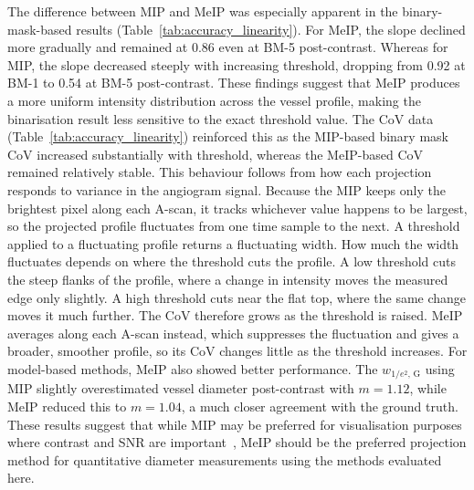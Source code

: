 \documentclass{optica-article}
\begin{document}
The difference between MIP and MeIP was especially apparent in the binary-mask-based results (Table~\ref{tab:accuracy_linearity}). For MeIP, the slope declined more gradually and remained at 0.86 even at BM-5 post-contrast. Whereas for MIP, the slope decreased steeply with increasing threshold, dropping from 0.92 at BM-1 to 0.54 at BM-5 post-contrast. These findings suggest that MeIP produces a more uniform intensity distribution across the vessel profile, making the binarisation result less sensitive to the exact threshold value. The CoV data (Table~\ref{tab:accuracy_linearity}) reinforced this as the MIP-based binary mask CoV increased substantially with threshold, whereas the MeIP-based CoV remained relatively stable. This behaviour follows from how each projection responds to variance in the angiogram signal. Because the MIP keeps only the brightest pixel along each A-scan, it tracks whichever value happens to be largest, so the projected profile fluctuates from one time sample to the next. A threshold applied to a fluctuating profile returns a fluctuating width. How much the width fluctuates depends on where the threshold cuts the profile. A low threshold cuts the steep flanks of the profile, where a change in intensity moves the measured edge only slightly. A high threshold cuts near the flat top, where the same change moves it much further. The CoV therefore grows as the threshold is raised. MeIP averages along each A-scan instead, which suppresses the fluctuation and gives a broader, smoother profile, so its CoV changes little as the threshold increases. For model-based methods, MeIP also showed better performance. The $w_{1/e^2,\,\mathrm{G}}$ using MIP slightly overestimated vessel diameter post-contrast with $m = 1.12$, while MeIP reduced this to $m = 1.04$, a much closer agreement with the ground truth. These results suggest that while MIP may be preferred for visualisation purposes where contrast and SNR are important~\cite{hormelMaximumValueProjection2018}, MeIP should be the preferred projection method for quantitative diameter measurements using the methods evaluated here.
\end{document}
